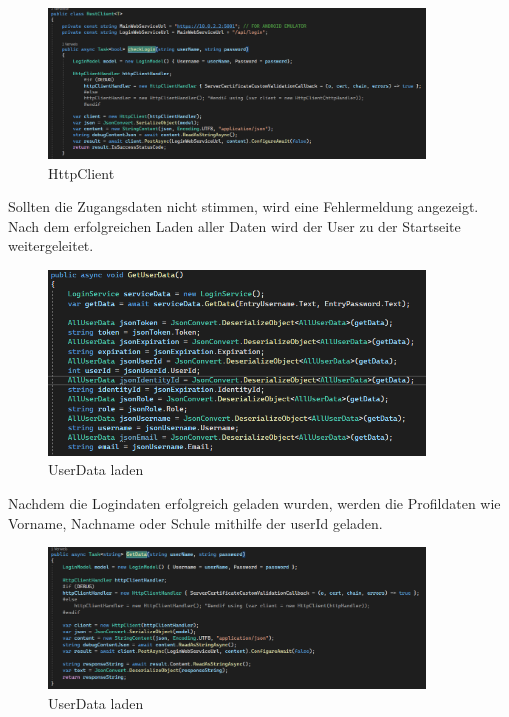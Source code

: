 \begin{figure}[h]
    \begin{center}\includegraphics[width=10cm]{pics/Xamarin Frontend/3.png}
    \caption[Login]{HttpClient}
    \end{center}
\end{figure}
\newline
Sollten die Zugangsdaten nicht stimmen, wird eine Fehlermeldung angezeigt.
Nach dem erfolgreichen Laden aller Daten wird der User zu der Startseite
weitergeleitet.
\newline
\begin{figure}[h]
    \begin{center}\includegraphics[width=10cm]{pics/Xamarin Frontend/4.png}
    \caption[Login]{UserData laden}
    \end{center}
\end{figure}
\newline
Nachdem die Logindaten erfolgreich geladen wurden, werden die Profildaten
wie Vorname, Nachname oder Schule mithilfe der userId geladen.
\newline
\begin{figure}[h]
    \begin{center}\includegraphics[width=10cm]{pics/Xamarin Frontend/5.png}
    \caption[Login]{UserData laden}
    \end{center}
\end{figure}
\newpage


